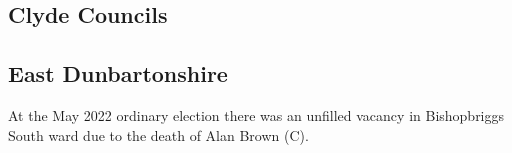 \documentclass[a4paper,openany]{book}
\begin{document}
\begin{resultsiii}
%
%
%
%
%
%
%

\section{Clyde Councils}

\subsection*{East Dunbartonshire}

At the May 2022 ordinary election there was an unfilled vacancy in Bishopbriggs South ward due to the death of Alan Brown (C).%


\end{resultsiii}
\end{document}
